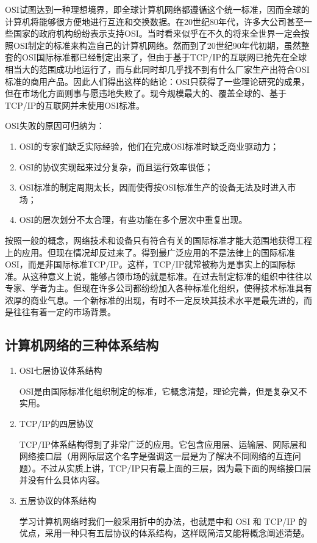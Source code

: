 OSI试图达到一种理想境界，即全球计算机网络都遵循这个统一标准，因而全球的计算机将能够很方便地进行互连和交换数据。在20世纪80年代，许多大公司甚至一些国家的政府机构纷纷表示支持OSI。当时看来似乎在不久的将来全世界一定会按照OSI制定的标准来构造自己的计算机网络。然而到了20世纪90年代初期，虽然整套的OSI国际标准都已经制定出来了，但由于基于TCP/IP的互联网已抢先在全球相当大的范围成功地运行了，而与此同时却几乎找不到有什么厂家生产出符合OSI标准的商用产品。因此人们得出这样的结论：OSI只获得了一些理论研究的成果，但在市场化方面则事与愿违地失败了。现今规模最大的、覆盖全球的、基于TCP/IP的互联网并未使用OSI标准。

OSI失败的原因可归纳为：
\begin{enumerate}
    \item OSI的专家们缺乏实际经验，他们在完成OSI标准时缺乏商业驱动力；
    \item OSI的协议实现起来过分复杂，而且运行效率很低；
    \item OSI标准的制定周期太长，因而使得按OSI标准生产的设备无法及时进入市场；
    \item OSI的层次划分不太合理，有些功能在多个层次中重复出现。
\end{enumerate}

按照一般的概念，网络技术和设备只有符合有关的国际标准才能大范围地获得工程上的应用。但现在情况却反过来了。得到最广泛应用的不是法律上的国际标准OSI，而是非国际标准TCP/IP。这样，TCP/IP就常被称为是事实上的国际标准。从这种意义上说，能够占领市场的就是标准。在过去制定标准的组织中往往以专家、学者为主。但现在许多公司都纷纷加入各种标准化组织，使得技术标准具有浓厚的商业气息。一个新标准的出现，有时不一定反映其技术水平是最先进的，而是往往有着一定的市场背景。


\subsection{计算机网络的三种体系结构}

\begin{enumerate}
    \item OSI七层协议体系结构
    
    OSI是由国际标准化组织制定的标准，它概念清楚，理论完善，但是复杂又不实用。
    \item TCP/IP的四层协议
    
    TCP/IP体系结构得到了非常广泛的应用。它包含应用层、运输层、网际层和网络接口层（用网际层这个名字是强调这一层是为了解决不同网络的互连问题）。不过从实质上讲，TCP/IP只有最上面的三层，因为最下面的网络接口层并没有什么具体内容。
    \item 五层协议的体系结构
    
    学习计算机网络时我们一般采用折中的办法，也就是中和 OSI 和 TCP/IP 的优点，采用一种只有五层协议的体系结构，这样既简洁又能将概念阐述清楚。
\end{enumerate}

